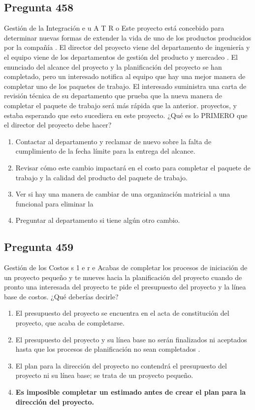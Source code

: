 \documentclass[11pt,a4paper]{article}
\begin{document}
\subsection*{Pregunta 458}
Gestión de la Integración e u A T R o Este proyecto está concebido para determinar nuevas formas de extender la vida de uno de los productos producidos por la compañía . El director del proyecto viene del departamento de ingeniería y el equipo viene de los departamentos de gestión del producto y mercadeo . El enunciado del alcance del proyecto y la planificación del proyecto se han completado, pero un interesado notifica al equipo que hay una mejor manera de completar uno de los paquetes de trabajo. El interesado suministra una carta de revisión técnica de su departamento que prueba que la nueva manera de completar el paquete de trabajo será más rápida que la anterior. proyectos, y estaba esperando que esto sucediera en este proyecto. ¿Qué es lo PRIMERO que el director del proyecto debe hacer?

\begin{enumerate}[label=\alph*)]
  \item Contactar al departamento y reclamar de nuevo sobre la falta de cumplimiento de la fecha límite para la entrega del alcance.
  \item Revisar cómo este cambio impactará en el costo para completar el paquete de trabajo y la calidad del producto del paquete de trabajo.
  \item Ver si hay una manera de cambiar de una organización matricial a una funcional para eliminar la
  \item Preguntar al departamento si tiene algún otro cambio.
\end{enumerate}

\subsection*{Pregunta 459}
Gestión de los Costos s 1 e r e Acabas de completar los procesos de iniciación de un proyecto pequeño y te mueves hacia la planificación del proyecto cuando de pronto una interesada del proyecto te pide el presupuesto del proyecto y la línea base de costos. ¿Qué deberías decirle?

\begin{enumerate}[label=\alph*)]
  \item El presupuesto del proyecto se encuentra en el acta de constitución del proyecto, que acaba de completarse.
  \item El presupuesto del proyecto y su línea base no serán finalizados ni aceptados hasta que los procesos de planificación no sean completados .
  \item El plan para la dirección del proyecto no contendrá el presupuesto del proyecto ni su línea base; se trata de un proyecto pequeño.
  \item \textbf{Es imposible completar un estimado antes de crear el plan para la dirección del proyecto.}
\end{enumerate}
\end{document}
